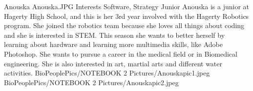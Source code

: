 \insertbio
{Anouska}
{Anouska.JPG}
{Interests}
{Software, Strategy}
{Junior}
{
Anouska is a junior at Hagerty High School, and this is her 3rd year involved with the Hagerty Robotics program. She joined the robotics team because she loves all things about coding and she is interested in STEM. This season she wants to better herself by learning about hardware and learning more multimedia skills, like Adobe Photoshop. She wants to pursue a career in the medical field or in Biomedical engineering. She is also interested in art, martial arts and different water activities. 
}
{BioPeoplePics/NOTEBOOK 2 Pictures/Anouskapic1.jpeg}
{BioPeoplePics/NOTEBOOK 2 Pictures/Anouskapic2.jpeg}